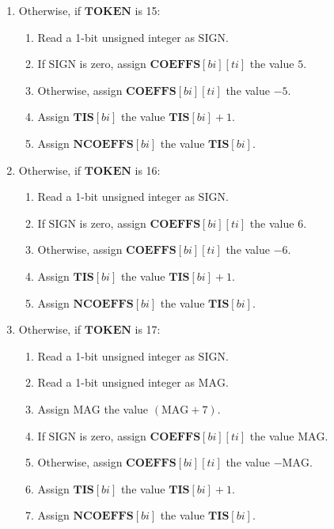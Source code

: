 \documentclass[9pt,letterpaper]{book}
\newcommand{\idx}[1]{{\ensuremath{\mathit{#1}}}}
\newcommand{\bi}{\idx{bi}}
\newcommand{\ti}{\idx{ti}}
\newcommand{\bitvar}[1]{\ensuremath{\mathbf{\bm{#1}}}}
\newcommand{\locvar}[1]{\ensuremath{\mathrm{#1}}}
\numberwithin{equation}{chapter}
\numberwithin{figure}{chapter}
\numberwithin{table}{chapter}
\begin{document}
\begin{enumerate}
\begin{enumerate}
\end{enumerate}
\item
Otherwise, if \bitvar{TOKEN} is 15:
\begin{enumerate}
\item
Read a 1-bit unsigned integer as \locvar{SIGN}.
\item
If \locvar{SIGN} is zero, assign $\bitvar{COEFFS}[\bitvar{\bi}][\bitvar{\ti}]$
 the value $5$.
\item
Otherwise, assign $\bitvar{COEFFS}[\bitvar{\bi}][\bitvar{\ti}]$ the value $-5$.
\item
Assign $\bitvar{TIS}[\bitvar{\bi}]$ the value $\bitvar{TIS}[\bitvar{\bi}]+1$.
\item
Assign $\bitvar{NCOEFFS}[\bitvar{\bi}]$ the value $\bitvar{TIS}[\bitvar{\bi}]$.
\end{enumerate}
\item
Otherwise, if \bitvar{TOKEN} is 16:
\begin{enumerate}
\item
Read a 1-bit unsigned integer as \locvar{SIGN}.
\item
If \locvar{SIGN} is zero, assign $\bitvar{COEFFS}[\bitvar{\bi}][\bitvar{\ti}]$
 the value $6$.
\item
Otherwise, assign $\bitvar{COEFFS}[\bitvar{\bi}][\bitvar{\ti}]$ the value $-6$.
\item
Assign $\bitvar{TIS}[\bitvar{\bi}]$ the value $\bitvar{TIS}[\bitvar{\bi}]+1$.
\item
Assign $\bitvar{NCOEFFS}[\bitvar{\bi}]$ the value $\bitvar{TIS}[\bitvar{\bi}]$.
\end{enumerate}
\item
Otherwise, if \bitvar{TOKEN} is 17:
\begin{enumerate}
\item
Read a 1-bit unsigned integer as \locvar{SIGN}.
\item
Read a 1-bit unsigned integer as \locvar{MAG}.
\item
Assign \locvar{MAG} the value $(\locvar{MAG}+7)$.
\item
If \locvar{SIGN} is zero, assign $\bitvar{COEFFS}[\bitvar{\bi}][\bitvar{\ti}]$
 the value $\locvar{MAG}$.
\item
Otherwise, assign $\bitvar{COEFFS}[\bitvar{\bi}][\bitvar{\ti}]$ the value
 $-\locvar{MAG}$.
\item
Assign $\bitvar{TIS}[\bitvar{\bi}]$ the value $\bitvar{TIS}[\bitvar{\bi}]+1$.
\item
Assign $\bitvar{NCOEFFS}[\bitvar{\bi}]$ the value $\bitvar{TIS}[\bitvar{\bi}]$.

\end{enumerate}
\end{enumerate}
\end{document}
